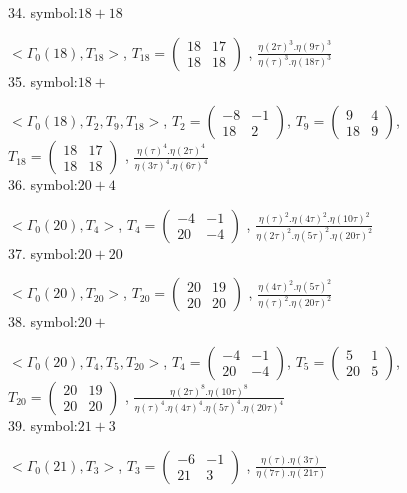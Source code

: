 34. symbol:$ 18+18 $

$ < \Gamma_0 ( 18 ), T_{18} >  $,
$
T_{18} = 
\left(
\begin{array}{cc}
18 & 17 \\
18 & 18
\end{array}
\right)
$
, {$ \frac{\eta(2\tau)^3 . \eta(9\tau)^3}{\eta(\tau)^3 . \eta(18\tau)^3} $}
\\

35. symbol:$ 18+ $

$ < \Gamma_0 ( 18 ), T_2, T_9, T_{18} >  $,
$
T_2 = 
\left(
\begin{array}{cc}
-8 & -1 \\
18 & 2
\end{array}
\right)
$,
$
T_9 = 
\left(
\begin{array}{cc}
9 & 4 \\
18 & 9
\end{array}
\right)
$,
$
T_{18} = 
\left(
\begin{array}{cc}
18 & 17 \\
18 & 18
\end{array}
\right)
$
, {$ \frac{\eta(\tau)^4 . \eta(2\tau)^4}{\eta(3\tau)^4 . \eta(6\tau)^4} $}
\\

36. symbol:$ 20+4 $

$ < \Gamma_0 ( 20 ), T_4 >  $,
$
T_4 = 
\left(
\begin{array}{cc}
-4 & -1 \\
20 & -4
\end{array}
\right)
$
, {$ \frac{\eta(\tau)^2 . \eta(4\tau)^2 . \eta(10\tau)^2}{\eta(2\tau)^2 . \eta(5\tau)^2 . \eta(20\tau)^2} $}
\\

37. symbol:$ 20+20 $

$ < \Gamma_0 ( 20 ), T_{20} >  $,
$
T_{20} = 
\left(
\begin{array}{cc}
20 & 19 \\
20 & 20
\end{array}
\right)
$
, {$ \frac{\eta(4\tau)^2 . \eta(5\tau)^2}{\eta(\tau)^2 . \eta(20\tau)^2} $}
\\

38. symbol:$ 20+ $

$ < \Gamma_0 ( 20 ), T_4, T_5, T_{20} >  $,
$
T_4 = 
\left(
\begin{array}{cc}
-4 & -1 \\
20 & -4
\end{array}
\right)
$,
$
T_5 = 
\left(
\begin{array}{cc}
5 & 1 \\
20 & 5
\end{array}
\right)
$,
$
T_{20} = 
\left(
\begin{array}{cc}
20 & 19 \\
20 & 20
\end{array}
\right)
$
, {$ \frac{\eta(2\tau)^8 . \eta(10\tau)^8}{\eta(\tau)^4 .\eta(4\tau)^4 .\eta(5\tau)^4. \eta(20\tau)^4} $}
\\

39. symbol:$ 21+3 $

$ < \Gamma_0 ( 21 ), T_3 >  $,
$
T_3 = 
\left(
\begin{array}{cc}
-6 & -1 \\
21 & 3
\end{array}
\right)
$
, {$ \frac{\eta(\tau) . \eta(3\tau)}{\eta(7\tau) . \eta(21\tau)} $}
\\